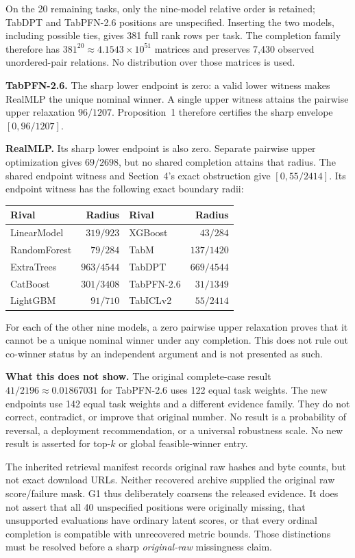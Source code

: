 \documentclass[11pt,a4paper]{article}
\begin{document}
On the 20 remaining tasks, only the nine-model relative order is retained;
TabDPT and TabPFN-2.6 positions are unspecified. Inserting the two models,
including possible ties, gives 381 full rank rows per task. The completion family
therefore has $381^{20}\approx4.1543\times10^{51}$ matrices and preserves 7,430
observed unordered-pair relations. No distribution over those matrices is used.

\textbf{TabPFN-2.6.} The sharp lower endpoint is zero: a valid lower witness
makes RealMLP the unique nominal winner. A single upper witness attains the
pairwise upper relaxation $96/1207$. Proposition~1 therefore certifies the sharp
envelope $[0,96/1207]$.

\textbf{RealMLP.} Its sharp lower endpoint is also zero. Separate pairwise upper
optimization gives $69/2698$, but no shared completion attains that radius.
The shared endpoint witness and Section~4's exact obstruction give
$[0,55/2414]$. Its endpoint witness has the following exact boundary radii:
\begin{center}
\begin{tabular}{lrlr}\toprule
Rival & Radius & Rival & Radius\\\midrule
LinearModel & $319/923$ & XGBoost & $43/284$\\
RandomForest & $79/284$ & TabM & $137/1420$\\
ExtraTrees & $963/4544$ & TabDPT & $669/4544$\\
CatBoost & $301/3408$ & TabPFN-2.6 & $31/1349$\\
LightGBM & $91/710$ & TabICLv2 & $55/2414$\\\bottomrule
\end{tabular}
\end{center}
For each of the other nine models, a zero pairwise upper relaxation proves that
it cannot be a unique nominal winner under any completion. This does not rule
out co-winner status by an independent argument and is not presented as such.

\textbf{What this does not show.} The original complete-case result
$41/2196\approx0.01867031$ for TabPFN-2.6 uses 122 equal task weights. The new
endpoints use 142 equal task weights and a different evidence family. They do
not correct, contradict, or improve that original number. No result is a
probability of reversal, a deployment recommendation, or a universal robustness
scale. No new result is asserted for top-$k$ or global feasible-winner entry.

The inherited retrieval manifest records original raw hashes and byte counts,
but not exact download URLs. Neither recovered archive supplied the original
raw score/failure mask. G1 thus deliberately coarsens the released evidence.
It does not assert that all 40 unspecified positions were originally missing,
that unsupported evaluations have ordinary latent scores, or that every ordinal
completion is compatible with unrecovered metric bounds. Those distinctions
must be resolved before a sharp \emph{original-raw} missingness claim.
\end{document}

